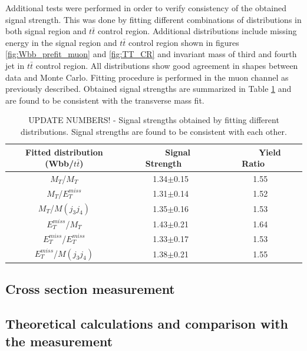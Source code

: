 Additional tests were performed in order to verify consistency of the obtained signal strength.
This was done by fitting different combinations of distributions in both signal region and $t\bar{t}$ control region.
Additional distributions include missing energy in the signal region and $t\bar{t}$ control region shown in figures \ref{fig:Wbb_prefit_muon} and \ref{fig:TT_CR} and invariant mass of third and fourth jet in $t\bar{t}$ control region. All distributions show good agreement
in shapes between data and Monte Carlo. Fitting procedure is performed in the muon channel as previously described.
Obtained signal strengths are summarized in Table \ref{tab:addFitTest} and are found to be consistent with the transverse mass fit.
\begin{table}[!htb]
\begin{center}
   \begin{tabular} {ccc} \hline\hline
   Fitted distribution (Wbb/$t\bar{t}$) & ~~~Signal Strength~~~ & ~~~~Yield Ratio~~~ \\
        \hline
        $M_T$/$M_T$                     &1.34$\pm$0.15  &1.55\\
        $M_T$/$E^{miss}_T$              &1.31$\pm$0.14  &1.52\\
        $M_T$/$M(j_3j_4)$               &1.35$\pm$0.16  &1.53\\
        $E^{miss}_T$/$M_T$              &1.43$\pm$0.21  &1.64\\
        $E^{miss}_T$/$E^{miss}_T$       &1.33$\pm$0.17  &1.53\\
        $E^{miss}_T$/$M(j_3j_4)$        &1.38$\pm$0.21  &1.55\\
   \hline\hline
   \end{tabular}
 \caption{UPDATE NUMBERS! - Signal strengths obtained by fitting different distributions. Signal strengths are found to be consistent with each other.}
\label{tab:addFitTest}
\end{center}
\end{table}

\subsection{Cross section measurement}



\subsection{Theoretical calculations and comparison with the measurement}





